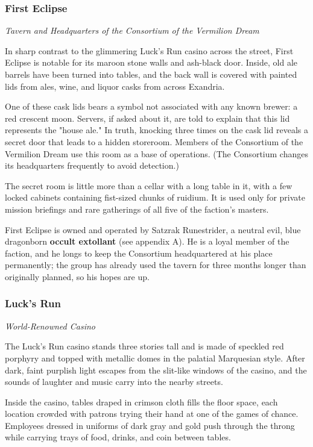 \documentclass[10pt,a4paper,twoside,fancy,bg=print,twocolumn,openany,nodeprecatedcode]{dndbook}
\begin{document}
\subsubsection{First Eclipse}
\textit{Tavern and Headquarters of the Consortium of the Vermilion Dream}

In sharp contrast to the glimmering Luck's Run casino across the street, First Eclipse is notable for its maroon stone walls and ash-black door. Inside, old ale barrels have been turned into tables, and the back wall is covered with painted lids from ales, wine, and liquor casks from across Exandria.

One of these cask lids bears a symbol not associated with any known brewer: a red crescent moon. Servers, if asked about it, are told to explain that this lid represents the "house ale." In truth, knocking three times on the cask lid reveals a secret door that leads to a hidden storeroom. Members of the Consortium of the Vermilion Dream use this room as a base of operations. (The Consortium changes its headquarters frequently to avoid detection.)

The secret room is little more than a cellar with a long table in it, with a few locked cabinets containing fist-sized chunks of ruidium. It is used only for private mission briefings and rare gatherings of all five of the faction's masters.

First Eclipse is owned and operated by Satzrak Runestrider, a neutral evil, blue dragonborn \textbf{occult extollant} (see appendix A). He is a loyal member of the faction, and he longs to keep the Consortium headquartered at his place permanently; the group has already used the tavern for three months longer than originally planned, so his hopes are up.

\subsubsection{Luck's Run}
\textit{World-Renowned Casino}

The Luck's Run casino stands three stories tall and is made of speckled red porphyry and topped with metallic domes in the palatial Marquesian style. After dark, faint purplish light escapes from the slit-like windows of the casino, and the sounds of laughter and music carry into the nearby streets.

Inside the casino, tables draped in crimson cloth fills the floor space, each location crowded with patrons trying their hand at one of the games of chance. Employees dressed in uniforms of dark gray and gold push through the throng while carrying trays of food, drinks, and coin between tables.
\end{document}
